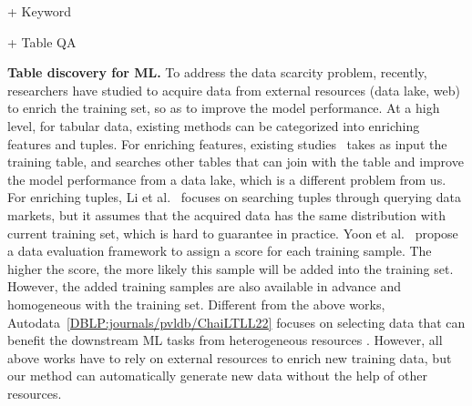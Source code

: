 + Keyword

+ Table QA


\noindent \textbf{Table discovery for ML.}
To address the data scarcity problem, recently, researchers have studied to acquire data from external resources (\eg data lake, web) to enrich the training set, so as to improve the model performance. At a high level, for tabular data, existing methods can be categorized into enriching features and tuples.
For enriching features, existing studies~\cite{DBLP:conf/icde/LiuCLLFT22,
	DBLP:journals/pvldb/ChepurkoMZFKK20,
	DBLP:conf/sigmod/KumarNPZ16} takes as input the training table, and searches other tables that can join with the table and improve the model performance from a data lake, which is a different problem from us.
For enriching tuples, Li et al.~\cite{DBLP:conf/icml/YoonAP20} focuses on searching tuples through querying data markets, but it assumes that the acquired data has the same distribution with current training set, which is hard to guarantee in practice. Yoon et al.~\cite{DBLP:journals/pvldb/LiYK21} propose a data evaluation framework to assign a score for each training sample. The higher the score, the more likely this sample will be added into the training set.  However, the added training samples are also available in advance and homogeneous with the training set. Different from the above works, Autodata~\ref{DBLP:journals/pvldb/ChaiLTLL22} focuses on selecting data that can benefit the downstream ML tasks from heterogeneous resources . However, all  above works have to rely on external resources to enrich new training data, but our method can automatically generate new data without the help of other resources.